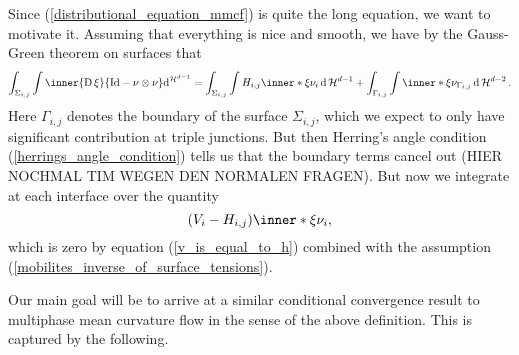 	Since (\ref{distributional_equation_mmcf}) is quite the long equation, we want to motivate it. Assuming that everything is nice and smooth, we have by the Gauss-Green theorem on surfaces \cite[Thm.~11.8]{maggi_sets_of_finite_perimeter} that
	\begin{equation*}
		\int_{ \Sigma_{ i , j } }
			\int 
				\inner{ \diff \xi }{ \mathrm{Id} - \nu \otimes \nu }
			\dd^{\hm^{ d- 1 }}
		=
		\int_{ \Sigma_{ i , j } }
			\int
				H_{ i , j } \inner*{ \xi }{ \nu_{ i } }
			\dd{\hm^{ d- 1 }}
		+
		\int_{ \Gamma_{ i , j } }
			\int
				\inner*{ \xi }{ \nu_{ \Gamma_{ i , j } } }
			\dd{ \hm^{ d - 2 } }.
	\end{equation*}
	Here $ \Gamma_{ i , j } $ denotes the boundary of the surface $ \Sigma_{ i , j } $, which we expect to only have significant contribution at triple junctions. But then Herring's angle condition (\ref{herrings_angle_condition}) tells us that the boundary terms cancel out (HIER NOCHMAL TIM WEGEN DEN NORMALEN FRAGEN). But now we integrate at each interface over the quantity
	\begin{equation*}
		(V_{ i } - H_{ i , j } ) \inner*{ \xi }{ \nu_{ i } },
	\end{equation*}
	which is zero by equation (\ref{v_is_equal_to_h}) combined with the 
	assumption (\ref{mobilites_inverse_of_surface_tensions}).
	
	Our main goal will be to arrive at a similar conditional convergence result 
	to multiphase mean curvature flow in the sense of the above definition. 
	This is captured by the following.
	
